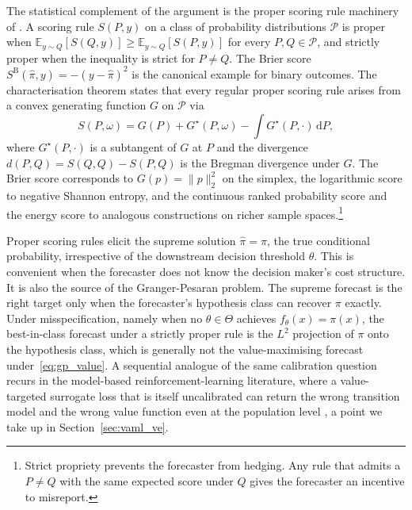 The statistical complement of the argument is the proper scoring rule
machinery of \citet{GneitingRaftery2007}. A scoring rule $S(P, y)$
on a class of probability distributions $\mathcal P$ is proper when
$\mathbb E_{y \sim Q}[S(Q, y)] \ge \mathbb E_{y \sim Q}[S(P, y)]$
for every $P, Q \in \mathcal P$, and strictly proper when the inequality
is strict for $P \ne Q$. The Brier score \citep{Brier1950}
$S^{\mathrm B}(\hat\pi, y) = -(y - \hat\pi)^2$ is the canonical example for
binary outcomes. The \citet{GneitingRaftery2007} characterisation theorem
states that every regular proper scoring rule arises from a convex
generating function $G$ on $\mathcal P$ via
\begin{equation}
S(P, \omega)
= G(P) + G^\star(P, \omega) - \int G^\star(P, \cdot)\, \mathrm dP,
\label{eq:proper_score_rep}
\end{equation}
where $G^\star(P, \cdot)$ is a subtangent of $G$ at $P$ and the divergence
$d(P, Q) = S(Q, Q) - S(P, Q)$ is the Bregman divergence under $G$. The
Brier score corresponds to $G(p) = \|p\|_2^2$ on the simplex, the
logarithmic score to negative Shannon entropy, and the continuous ranked
probability score and the energy score to analogous constructions on richer
sample spaces.\footnote{Strict propriety prevents the forecaster from
hedging. Any rule that admits a $P \ne Q$ with the same expected score
under $Q$ gives the forecaster an incentive to misreport.}

Proper scoring rules elicit the supreme solution $\hat\pi = \pi$, the true
conditional probability, irrespective of the downstream decision threshold
$\theta$. This is convenient when the forecaster does not know the
decision maker's cost structure. It is also the source of the
Granger-Pesaran problem. The supreme forecast is the right target only
when the forecaster's hypothesis class can recover $\pi$ exactly. Under
misspecification, namely when no $\theta \in \Theta$ achieves $f_\theta(x) =
\pi(x)$, the best-in-class forecast under a strictly proper rule is the
$L^2$ projection of $\pi$ onto the hypothesis class, which is generally
not the value-maximising forecast under~\eqref{eq:gp_value}. A sequential
analogue of the same calibration question recurs in the model-based
reinforcement-learning literature, where a value-targeted surrogate loss
that is itself uncalibrated can return the wrong transition model and the
wrong value function even at the population level
\citep{VoelckerCalib2025}, a point we take up in
Section~\ref{sec:vaml_ve}.


